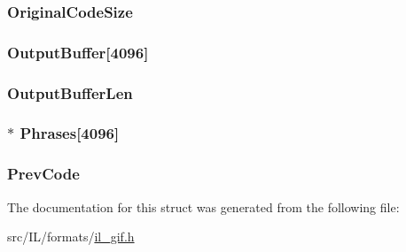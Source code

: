 \hypertarget{struct_l_z_w_input_stream_a9cb470e1e0e82894af5576c7eed36350}{
\subsubsection[{Original\-Code\-Size}]{ Original\-Code\-Size}}\label{struct_l_z_w_input_stream_a9cb470e1e0e82894af5576c7eed36350}
\hypertarget{struct_l_z_w_input_stream_acf6abe9a70f558ca4f7a5d7468e00971}{
\subsubsection[{Output\-Buffer}]{ Output\-Buffer\mbox{[}4096\mbox{]}}}\label{struct_l_z_w_input_stream_acf6abe9a70f558ca4f7a5d7468e00971}
\hypertarget{struct_l_z_w_input_stream_a8ac2523b0339ca070f6ae720ee8c7639}{
\subsubsection[{Output\-Buffer\-Len}]{ Output\-Buffer\-Len}}\label{struct_l_z_w_input_stream_a8ac2523b0339ca070f6ae720ee8c7639}
\hypertarget{struct_l_z_w_input_stream_a050a70048e7c13feccb81e4a228bfe5e}{
\subsubsection[{Phrases}]{$\ast$ Phrases\mbox{[}4096\mbox{]}}}\label{struct_l_z_w_input_stream_a050a70048e7c13feccb81e4a228bfe5e}
\hypertarget{struct_l_z_w_input_stream_a60483c15b159bc51bffa36d39d1ecfe1}{
\subsubsection[{Prev\-Code}]{ Prev\-Code}}\label{struct_l_z_w_input_stream_a60483c15b159bc51bffa36d39d1ecfe1}


The documentation for this struct was generated from the following file\-:\begin{DoxyCompactItemize}
\item 
src/\-I\-L/formats/\hyperlink{il__gif_8h}{il\-\_\-gif.\-h}\end{DoxyCompactItemize}

